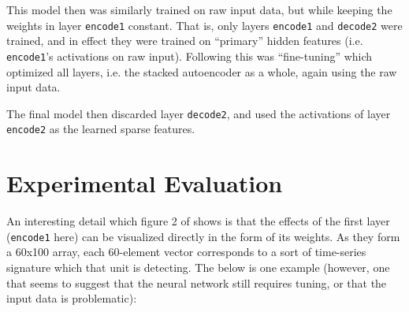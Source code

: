 \documentclass[journal]{IEEEtran}
\begin{document}
This model then was similarly trained on raw input data, but while
keeping the weights in layer \texttt{encode1} constant.  That is, only
layers \texttt{encode1} and \texttt{decode2} were trained, and in
effect they were trained on ``primary'' hidden features
(i.e. \texttt{encode1}'s activations on raw input).  Following this
was ``fine-tuning''\cite{Ng} which optimized all layers, i.e. the
stacked autoencoder as a whole, again using the raw input data.

The final model then discarded layer \texttt{decode2}, and used the
activations of layer \texttt{encode2} as the learned sparse features.



\section{Experimental Evaluation}

An interesting detail which figure 2 of \cite{Lasko2013} shows is that
the effects of the first layer (\texttt{encode1} here) can be
visualized directly in the form of its weights.  As they form a 60x100
array, each 60-element vector corresponds to a sort of time-series
signature which that unit is detecting.  The below is one example
(however, one that seems to suggest that the neural network still
requires tuning, or that the input data is problematic):
\end{document}
